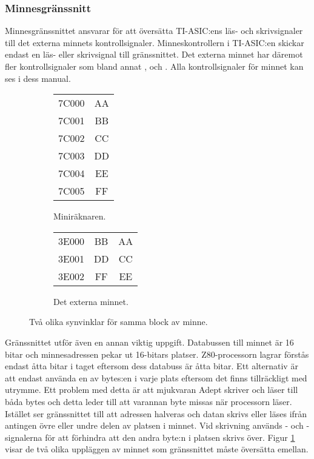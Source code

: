\documentclass[main.tex]{subfiles}
\begin{document}
\subsubsection{Minnesgränssnitt}
Minnesgränssnittet ansvarar för att översätta TI-ASIC:ens läs- och
skrivsignaler till det externa minnets kontrollsignaler. Minneskontrollern i
TI-ASIC:en skickar endast en läs- eller skrivsignal till gränssnittet. Det
externa minnet har däremot fler kontrollsignaler som bland annat
,  och . Alla
kontrollsignaler för minnet kan ses i dess manual.\cite{m45}

\begin{figure}
    \begin{subfigure}{0.5\textwidth}
        \centering
        \ttfamily
        \begin{tabular}{r|c|}
            \cline{2-2}
            7C000 & AA \\ \cline{2-2}
            7C001 & BB \\ \cline{2-2}
            7C002 & CC \\ \cline{2-2}
            7C003 & DD \\ \cline{2-2}
            7C004 & EE \\ \cline{2-2}
            7C005 & FF \\ \cline{2-2}
        \end{tabular}
        \caption{Miniräknaren.}
    \end{subfigure}
    \begin{subfigure}{0.5\textwidth}
        \centering
        \ttfamily
        \begin{tabular}{r|c|c|}
            \cline{2-3}
            3E000 & BB & AA \\ \cline{2-3}
            3E001 & DD & CC \\ \cline{2-3}
            3E002 & FF & EE \\ \cline{2-3}
        \end{tabular}
        \caption{Det externa minnet.}
    \end{subfigure}
    \caption{Två olika synvinklar för samma block av minne.}
    \label{fig:mif}
\end{figure}

Gränssnittet utför även en annan viktig uppgift. Databussen till minnet är 16
bitar och minnesadressen pekar ut 16-bitars platser. Z80-processorn lagrar
förstås endast åtta bitar i taget eftersom dess databuss är åtta bitar. Ett
alternativ är att endast använda en av bytes:en i varje plats eftersom det
finns tillräckligt med utrymme. Ett problem med detta är att mjukvaran Adept
skriver och läser till båda bytes och detta leder till att varannan byte missas
när processorn läser. Istället ser gränssnittet till att adressen halveras och
datan skrivs eller läses ifrån antingen övre eller undre delen av platsen i
minnet. Vid skrivning används - och
-signalerna för att förhindra att den andra byte:n i platsen
skrivs över. Figur \ref{fig:mif} visar de två olika uppläggen av minnet som
gränssnittet måste översätta emellan.
\end{document}
